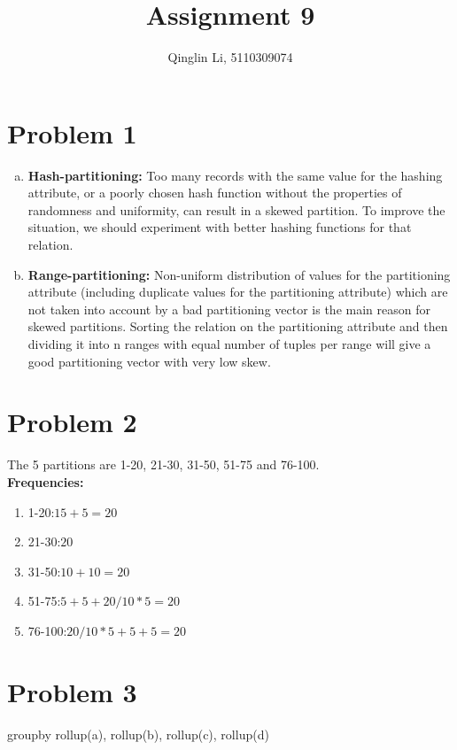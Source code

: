 \documentclass[a4paper,11pt]{article}
\begin{document}
\pagestyle{fancy}
\rfoot{\thepage}
\setlength{\parskip}{0.7ex plus0.2ex minus0.2ex}
\cfoot{\empty}
\lhead{\empty}


\title{Assignment 9}
\author{Qinglin Li, 5110309074}
\date{}
\maketitle

\headheight 3pt
\thispagestyle{fancy}
\section*{Problem 1}
\begin{enumerate}[a.]
\item 
\textbf{Hash-partitioning:}
Too many records with the same value for the hashing attribute, or a
poorly chosen hash function without the properties of randomness and
uniformity, can result in a skewed partition. To improve the situation, we
should experiment with better hashing functions for that relation.
\item
\textbf{Range-partitioning:}
Non-uniform distribution of values for the partitioning attribute (including
duplicate values for the partitioning attribute) which are not taken
into account by a bad partitioning vector is the main reason for skewed
partitions. Sorting the relation on the partitioning attribute and then dividing
it into n ranges with equal number of tuples per range will give a
good partitioning vector with very low skew.
\end{enumerate}

\section*{Problem 2}
The 5 partitions are
1-20, 21-30, 31-50, 51-75 and 76-100. \\
\textbf{Frequencies:}
\begin{enumerate}
\item 
1-20:$15+5=20$
\item 
21-30:$20$
\item
31-50:$10+10=20$
\item
51-75:$5+5+20/10*5=20$
\item
76-100:$20/10*5+5+5=20$
\end{enumerate}

\section*{Problem 3}
groupby rollup(a), rollup(b), rollup(c), rollup(d)
\end{document}
